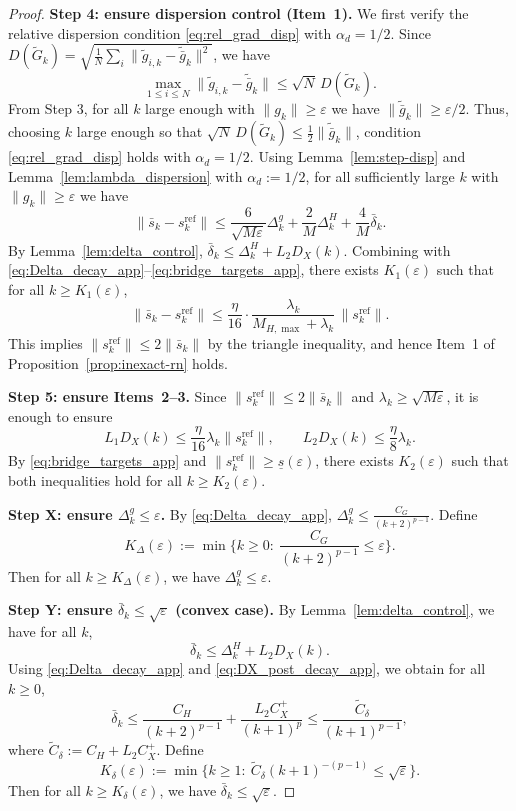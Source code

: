 \documentclass[11pt,a4paper]{article}
\begin{document}
\begin{proof}
\smallskip
\noindent\textbf{Step 4: ensure dispersion control (Item~1).}
We first verify the relative dispersion condition \eqref{eq:rel_grad_disp} with $\alpha_d=1/2$.
Since $D(\tilde G_k)=\sqrt{\frac1N\sum_i\|\tilde g_{i,k}-\tilde{\bar g}_k\|^2}$, we have
\[
\max_{1\le i\le N}\|\tilde g_{i,k}-\tilde{\bar g}_k\|
\le \sqrt{N}\,D(\tilde G_k).
\]
From Step 3, for all $k$ large enough with $\|g_k\|\ge \varepsilon$ we have $\|\tilde{\bar g}_k\|\ge \varepsilon/2$.
Thus, choosing $k$ large enough so that $\sqrt N\,D(\tilde G_k)\le \frac12\|\tilde{\bar g}_k\|$,
condition \eqref{eq:rel_grad_disp} holds with $\alpha_d=1/2$.
Using Lemma~\ref{lem:step-disp} and Lemma~\ref{lem:lambda_dispersion} with $\alpha_d:=1/2$,
for all sufficiently large $k$ with $\|g_k\|\ge \varepsilon$ we have
\[
\|\bar s_k-s_k^{\mathrm{ref}}\|
\le \frac{6}{\sqrt{M\varepsilon}}\Delta_k^g+\frac{2}{M}\Delta_k^H+\frac{4}{M}\bar\delta_k.
\]
By Lemma~\ref{lem:delta_control}, $\bar\delta_k\le \Delta_k^H+L_2D_X(k)$.
Combining with \eqref{eq:Delta_decay_app}--\eqref{eq:bridge_targets_app}, there exists $K_1(\varepsilon)$ such that for all $k\ge K_1(\varepsilon)$,
\[
\|\bar s_k-s_k^{\mathrm{ref}}\|\le \frac{\eta}{16}\cdot \frac{\lambda_k}{M_{H,\max}+\lambda_k}\,\|s_k^{\mathrm{ref}}\|.
\]
This implies $\|s_k^{\mathrm{ref}}\|\le 2\|\bar s_k\|$ by the triangle inequality, and hence Item~1 of Proposition~\ref{prop:inexact-rn} holds.

\smallskip
\noindent\textbf{Step 5: ensure Items~2--3.}
Since $\|s_k^{\mathrm{ref}}\|\le 2\|\bar s_k\|$ and $\lambda_k\ge \sqrt{M\varepsilon}$, it is enough to ensure
\[
L_1D_X(k)\le \frac{\eta}{16}\lambda_k\|s_k^{\mathrm{ref}}\|,
\qquad
L_2D_X(k)\le \frac{\eta}{8}\lambda_k.
\]
By \eqref{eq:bridge_targets_app} and $\|s_k^{\mathrm{ref}}\|\ge \underline s(\varepsilon)$, there exists $K_2(\varepsilon)$ such that both inequalities hold for all $k\ge K_2(\varepsilon)$.

\smallskip
\noindent\textbf{Step X: ensure $\Delta_k^g\le \varepsilon$.}
By \eqref{eq:Delta_decay_app}, $\Delta_k^g\le \frac{C_G}{(k+2)^{p-1}}$.
Define
\[
K_\Delta(\varepsilon):=\min\Big\{k\ge 0:\ \frac{C_G}{(k+2)^{p-1}}\le \varepsilon\Big\}.
\]
Then for all $k\ge K_\Delta(\varepsilon)$, we have $\Delta_k^g\le \varepsilon$.

\smallskip
\noindent\textbf{Step Y: ensure $\bar\delta_k\le \sqrt{\varepsilon}$ (convex case).}
By Lemma~\ref{lem:delta_control}, we have for all $k$,
\[
\bar\delta_k\le \Delta_k^H + L_2D_X(k).
\]
Using \eqref{eq:Delta_decay_app} and \eqref{eq:DX_post_decay_app}, we obtain for all $k\ge 0$,
\[
\bar\delta_k
\le \frac{C_H}{(k+2)^{p-1}}+\frac{L_2C_X^{+}}{(k+1)^p}
\le \frac{\widetilde C_\delta}{(k+1)^{p-1}},
\]
where $\widetilde C_\delta:=C_H+L_2C_X^{+}$.
Define
\[
K_\delta(\varepsilon):=\min\Big\{k\ge 1:\ \widetilde C_\delta (k+1)^{-(p-1)}\le \sqrt{\varepsilon}\Big\}.
\]
Then for all $k\ge K_\delta(\varepsilon)$, we have $\bar\delta_k\le \sqrt{\varepsilon}$.


\end{proof}
\end{document}
